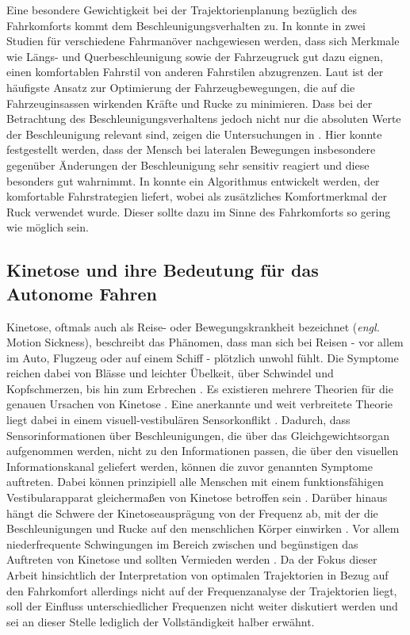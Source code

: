Eine besondere Gewichtigkeit bei der Trajektorienplanung bezüglich des Fahrkomforts kommt dem Beschleunigungsverhalten zu. In \cite{Bellem.2016} konnte in zwei Studien für verschiedene Fahrmanöver nachgewiesen werden, dass sich Merkmale wie Längs- und Querbeschleunigung sowie der Fahrzeugruck gut dazu eignen, einen komfortablen Fahrstil von anderen Fahrstilen abzugrenzen. Laut \cite{Elbanhawi.2015} ist der häufigste Ansatz zur Optimierung der Fahrzeugbewegungen, die auf die Fahrzeuginsassen wirkenden Kräfte und Rucke zu minimieren. Dass bei der Betrachtung des Beschleunigungsverhaltens jedoch nicht nur die absoluten Werte der Beschleunigung relevant sind, zeigen die Untersuchungen in \cite{Gianna.1996}. Hier konnte festgestellt werden, dass der Mensch bei lateralen Bewegungen insbesondere gegenüber Änderungen der Beschleunigung sehr sensitiv reagiert und diese besonders gut wahrnimmt. In \cite{Dovgan.2013} konnte ein Algorithmus entwickelt werden, der komfortable Fahrstrategien liefert, wobei als zusätzliches Komfortmerkmal der Ruck verwendet wurde. Dieser sollte dazu im Sinne des Fahrkomforts so gering wie möglich sein.

\subsection{Kinetose und ihre Bedeutung für das Autonome Fahren}\label{sec:kinetose}
Kinetose, oftmals auch als Reise- oder Bewegungskrankheit bezeichnet (\textit{engl.} Motion Sickness), beschreibt das Phänomen, dass man sich bei Reisen - vor allem im Auto, Flugzeug oder auf einem Schiff - plötzlich unwohl fühlt. Die Symptome reichen dabei von Blässe und leichter Übelkeit, über Schwindel und Kopfschmerzen, bis hin zum Erbrechen \cite{Money.1970}. Es existieren mehrere Theorien für die genauen Ursachen von Kinetose \cite{Money.1970}. Eine anerkannte und weit verbreitete Theorie liegt dabei in einem visuell-vestibulären Sensorkonflikt \cite{Reason.1975,Golding.2006,Benson.2002}. Dadurch, dass Sensorinformationen über Beschleunigungen, die über das Gleichgewichtsorgan aufgenommen werden, nicht zu den Informationen passen, die über den visuellen Informationskanal geliefert werden, können die zuvor genannten Symptome auftreten. Dabei können prinzipiell alle Menschen mit einem funktionsfähigen Vestibularapparat gleichermaßen von Kinetose betroffen sein \cite{Lackner.2014}. Darüber hinaus hängt die Schwere der Kinetoseausprägung von der Frequenz ab, mit der die Beschleunigungen und Rucke auf den menschlichen Körper einwirken \cite{OHanlon.1974}. Vor allem niederfrequente Schwingungen im Bereich zwischen  und  begünstigen das Auftreten von Kinetose und sollten Vermieden werden \cite{OHanlon.1974,ISO.2631}. Da der Fokus dieser Arbeit hinsichtlich der Interpretation von optimalen Trajektorien in Bezug auf den Fahrkomfort allerdings nicht auf der Frequenzanalyse der Trajektorien liegt, soll der Einfluss unterschiedlicher Frequenzen nicht weiter diskutiert werden und sei an dieser Stelle lediglich der Vollständigkeit halber erwähnt.

